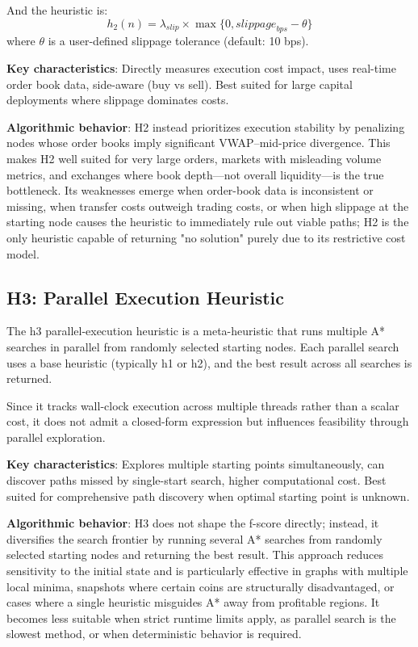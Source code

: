 \documentclass[11pt]{article}
\begin{document}
And the heuristic is:
\[
h_2(n) = \lambda_{slip} \times \max\{0,\textit{slippage}_{bps} - \theta\}
\]
where $\theta$ is a user-defined slippage tolerance (default: 10 bps).

\textbf{Key characteristics}: Directly measures execution cost impact, uses real-time order book data, side-aware (buy vs sell). Best suited for large capital deployments where slippage dominates costs.

\textbf{Algorithmic behavior}: H2 instead prioritizes execution stability by penalizing nodes whose order books imply significant VWAP--mid-price divergence. This makes H2 well suited for very large orders, markets with misleading volume metrics, and exchanges where book depth---not overall liquidity---is the true bottleneck. Its weaknesses emerge when order-book data is inconsistent or missing, when transfer costs outweigh trading costs, or when high slippage at the starting node causes the heuristic to immediately rule out viable paths; H2 is the only heuristic capable of returning "no solution" purely due to its restrictive cost model.

\subsection{H3: Parallel Execution Heuristic}

The h3 parallel-execution heuristic is a meta-heuristic that runs multiple A* searches in parallel from randomly selected starting nodes. Each parallel search uses a base heuristic (typically h1 or h2), and the best result across all searches is returned.

Since it tracks wall-clock execution across multiple threads rather than a scalar cost, it does not admit a closed-form expression but influences feasibility through parallel exploration.

\textbf{Key characteristics}: Explores multiple starting points simultaneously, can discover paths missed by single-start search, higher computational cost. Best suited for comprehensive path discovery when optimal starting point is unknown.

\textbf{Algorithmic behavior}: H3 does not shape the f-score directly; instead, it diversifies the search frontier by running several A* searches from randomly selected starting nodes and returning the best result. This approach reduces sensitivity to the initial state and is particularly effective in graphs with multiple local minima, snapshots where certain coins are structurally disadvantaged, or cases where a single heuristic misguides A* away from profitable regions. It becomes less suitable when strict runtime limits apply, as parallel search is the slowest method, or when deterministic behavior is required.
\end{document}
